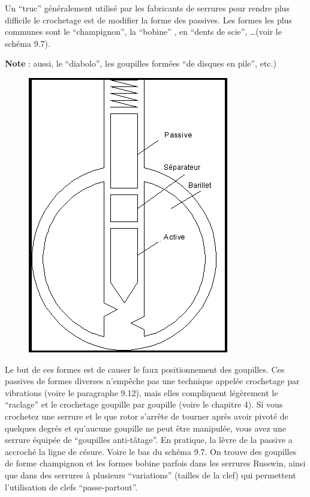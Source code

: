 \documentclass[a4paper,french,11pt,twoside]{report}
\begin{document}
Un \enquote{truc} généralement utilisé par les fabricants de serrures pour rendre plus difficile le crochetage est de modifier la forme des passives. Les formes les plus communes sont le \enquote{champignon}, la \enquote{bobine} , en \enquote{dents de scie}, \ldots (voir le schéma 9.7).

\noindent \textbf{Note} : aussi, le \enquote{diabolo}, les  goupilles formées \enquote{de disques en pile}, etc.)

\begin{figure}[h] \begin{center}
        \includegraphics[scale=0.6]{images/Image24}
        \caption{}
\end{center} \end{figure}

Le but de ces formes est de causer le faux positionnement des goupilles. Ces passives de formes diverses n'empêche pas une technique appelée crochetage par vibrations (voire le paragraphe 9.12), mais elles compliquent légèrement le \enquote{raclage} et le crochetage goupille par goupille (voire le chapitre 4).
Si vous crochetez une serrure et le que rotor s'arrête de tourner après avoir pivoté de quelques degrés et qu'aucune goupille ne peut être manipulée, vous avez une serrure équipée de \enquote{goupilles anti-tâtage}. En pratique, la lèvre de la passive a accroché la ligne de césure. Voire le bas du schéma 9.7. On trouve des goupilles de forme champignon et les formes bobine parfois dans les serrures Russwin, ainsi que dans des serrures à plusieurs \enquote{variations} (tailles de la clef) qui permettent l'utilisation de clefs \enquote{passe-partout}.
\end{document}
